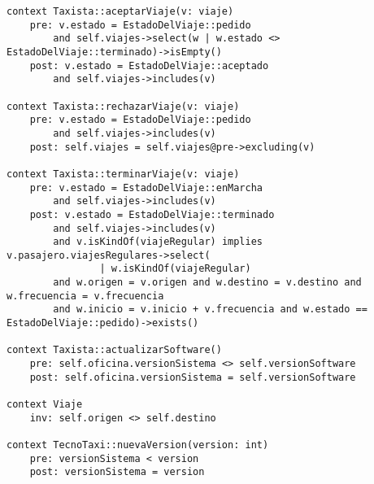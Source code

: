 \begin{lstlisting}[frame=single]
context Taxista::aceptarViaje(v: viaje)
	pre: v.estado = EstadoDelViaje::pedido
		and self.viajes->select(w | w.estado <> EstadoDelViaje::terminado)->isEmpty() 
	post: v.estado = EstadoDelViaje::aceptado
		and self.viajes->includes(v) 

context Taxista::rechazarViaje(v: viaje)
	pre: v.estado = EstadoDelViaje::pedido
		and self.viajes->includes(v)
	post: self.viajes = self.viajes@pre->excluding(v)

context Taxista::terminarViaje(v: viaje)
	pre: v.estado = EstadoDelViaje::enMarcha
		and self.viajes->includes(v) 
	post: v.estado = EstadoDelViaje::terminado
		and self.viajes->includes(v)
		and v.isKindOf(viajeRegular) implies v.pasajero.viajesRegulares->select(
				| w.isKindOf(viajeRegular)
		and w.origen = v.origen and w.destino = v.destino and w.frecuencia = v.frecuencia
		and w.inicio = v.inicio + v.frecuencia and w.estado == EstadoDelViaje::pedido)->exists()

context Taxista::actualizarSoftware()
	pre: self.oficina.versionSistema <> self.versionSoftware
	post: self.oficina.versionSistema = self.versionSoftware

context Viaje
	inv: self.origen <> self.destino

context TecnoTaxi::nuevaVersion(version: int)
	pre: versionSistema < version
	post: versionSistema = version
\end{lstlisting}

